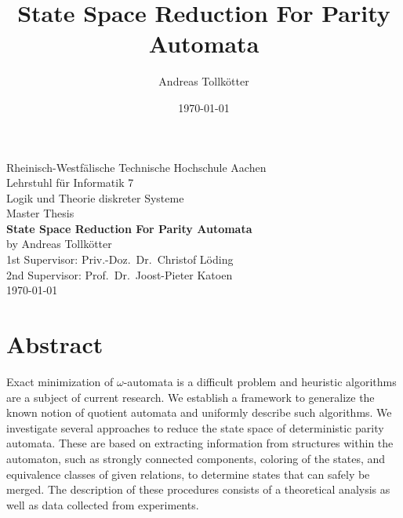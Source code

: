 \title{State Space Reduction For Parity Automata}
\author{Andreas Tollkötter}
\date{\today}

\pagestyle{empty}
\begin{titlepage}
\begin{center}
	\vspace*{\fill}
		\LARGE Rheinisch-Westfälische Technische Hochschule Aachen \\
	\vspace*{1cm}
		\LARGE Lehrstuhl für Informatik 7 \\
		\Large Logik und Theorie diskreter Systeme \\
	\vspace*{2cm}
		\LARGE Master Thesis \\
	\vspace*{5mm}
		\huge \textbf{State Space Reduction For Parity Automata} \\
	\vspace*{1cm}
		\Large by Andreas Tollkötter \\
	\vspace*{5mm}
		\Large 1st Supervisor: Priv.-Doz.\ Dr.\ Christof Löding \\
		\Large 2nd Supervisor: Prof.\ Dr.\ Joost-Pieter Katoen \\
	\vspace*{2cm}
		\large \today 
	\vspace*{\fill}
\end{center}
\end{titlepage}







\chapter*{Abstract}
Exact minimization of $\omega$-automata is a difficult problem and heuristic algorithms are a subject of current research. We establish a framework to generalize the known notion of quotient automata and uniformly describe such algorithms. We investigate several approaches to reduce the state space of deterministic parity automata. These are based on extracting information from structures within the automaton, such as strongly connected components, coloring of the states, and equivalence classes of given relations, to determine states that can safely be merged. The description of these procedures consists of a theoretical analysis as well as data collected from experiments.

